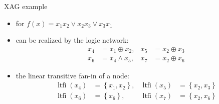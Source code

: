   \begin{frame}{XAG example}
    \begin{itemize}
      \item for $f(x)=x_1x_2\vee x_2x_3\vee x_3x_1$
      \item can be realized by the logic network: 
      \begin{align}
        x_{4} & = x_{1} \oplus x_{2}, & x_{5} & = x_{2} \oplus x_{3} \\
        x_{6} & = x_{4} \wedge x_{5}, & x_{7} & = x_{2} \oplus x_{6}
      \end{align}
      \item the linear transitive fan-in of a node:
      \begin{align}
        \operatorname{ltfi}\left(x_{4}\right) & = \left\{x_{1}, x_{2}\right\} 
        ,&\operatorname{ltfi}\left(x_{5}\right) & = \left\{x_{2}, x_{3}\right\} \\
        \operatorname{ltfi}\left(x_{6}\right) & = \left\{x_{6}\right\} 
        ,&\operatorname{ltfi}\left(x_{7}\right) & = \left\{x_{2}, x_{6}\right\} 
      \end{align}
    \end{itemize}
  \end{frame}
  
